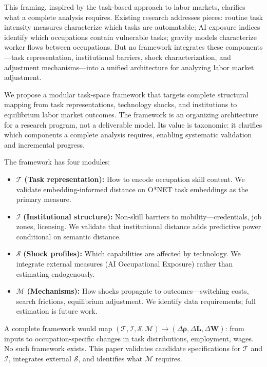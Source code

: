 \documentclass[12pt]{article}
\begin{document}
This framing, inspired by the task-based approach to labor markets, clarifies what a complete analysis requires. Existing research addresses pieces: routine task intensity measures characterize which tasks are automatable; AI exposure indices identify which occupations contain vulnerable tasks; gravity models characterize worker flows between occupations. But no framework integrates these components---task representation, institutional barriers, shock characterization, and adjustment mechanisms---into a unified architecture for analyzing labor market adjustment.


We propose a modular task-space framework that targets complete structural mapping from task representations, technology shocks, and institutions to equilibrium labor market outcomes. The framework is an organizing architecture for a research program, not a deliverable model. Its value is taxonomic: it clarifies which components a complete analysis requires, enabling systematic validation and incremental progress.

The framework has four modules:
\begin{itemize}
    \item $\mathcal{T}$ \textbf{(Task representation):} How to encode occupation skill content. We validate embedding-informed distance on O*NET task embeddings as the primary measure.
    \item $\mathcal{I}$ \textbf{(Institutional structure):} Non-skill barriers to mobility---credentials, job zones, licensing. We validate that institutional distance adds predictive power conditional on semantic distance.
    \item $\mathcal{S}$ \textbf{(Shock profiles):} Which capabilities are affected by technology. We integrate external measures (AI Occupational Exposure) rather than estimating endogenously.
    \item $\mathcal{M}$ \textbf{(Mechanisms):} How shocks propagate to outcomes---switching costs, search frictions, equilibrium adjustment. We identify data requirements; full estimation is future work.
\end{itemize}

A complete framework would map $(\mathcal{T}, \mathcal{I}, \mathcal{S}, \mathcal{M}) \to (\Delta\boldsymbol{\rho}, \Delta \mathbf{L}, \Delta \mathbf{W})$: from inputs to occupation-specific changes in task distributions, employment, wages. No such framework exists. This paper validates candidate specifications for $\mathcal{T}$ and $\mathcal{I}$, integrates external $\mathcal{S}$, and identifies what $\mathcal{M}$ requires.
\end{document}
